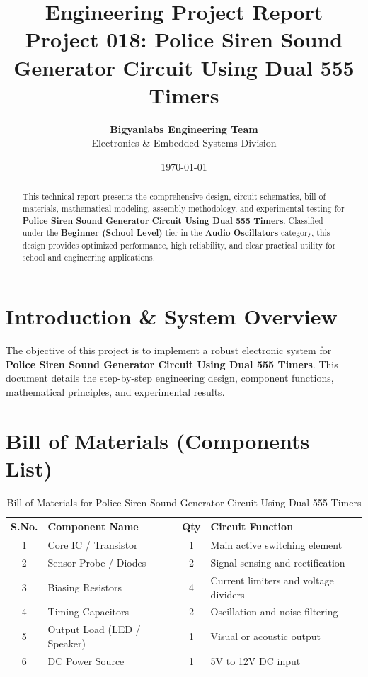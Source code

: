 \documentclass[11pt,a4paper]{article}
\title{\textbf{\Huge Engineering Project Report}\\[0.5em] \Large Project 018: Police Siren Sound Generator Circuit Using Dual 555 Timers}
\author{\textbf{Bigyanlabs Engineering Team}\\ Electronics \& Embedded Systems Division}
\date{\today}
\begin{document}
\maketitle
\thispagestyle{empty}

\begin{abstract}
This technical report presents the comprehensive design, circuit schematics, bill of materials, mathematical modeling, assembly methodology, and experimental testing for \textbf{Police Siren Sound Generator Circuit Using Dual 555 Timers}. Classified under the \textbf{Beginner (School Level)} tier in the \textbf{Audio Oscillators} category, this design provides optimized performance, high reliability, and clear practical utility for school and engineering applications.
\end{abstract}

\newpage
\tableofcontents
\newpage

\section{Introduction \& System Overview}
The objective of this project is to implement a robust electronic system for \textbf{Police Siren Sound Generator Circuit Using Dual 555 Timers}. This document details the step-by-step engineering design, component functions, mathematical principles, and experimental results.

\section{Bill of Materials (Components List)}
\begin{table}[h!]
\centering
\caption{Bill of Materials for Police Siren Sound Generator Circuit Using Dual 555 Timers}
\vspace{0.5em}
\begin{tabular}{clcp{7cm}}
\toprule
\textbf{S.No.} & \textbf{Component Name} & \textbf{Qty} & \textbf{Circuit Function} \\
\midrule
1 & Core IC / Transistor & 1 & Main active switching element \\
2 & Sensor Probe / Diodes & 2 & Signal sensing and rectification \\
3 & Biasing Resistors & 4 & Current limiters and voltage dividers \\
4 & Timing Capacitors & 2 & Oscillation and noise filtering \\
5 & Output Load (LED / Speaker) & 1 & Visual or acoustic output \\
6 & DC Power Source & 1 & 5V to 12V DC input \\
\bottomrule
\end{tabular}
\end{table}
\end{document}
